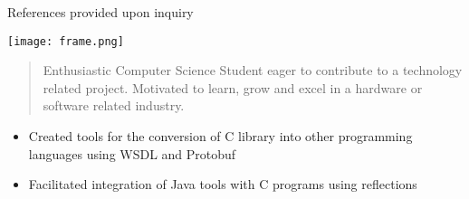 \documentclass[10pt,a4paper,ragged2e,withhyper]{altacv}
\begin{document}
\begin{paracol}{2}
            References provided upon inquiry
        
        \parskip 12pt
        \texttt{[image: frame.png]}
        
        \parskip 0pt
        
        
        
        
        \newpage
        
        \switchcolumn
        
            \begin{quote}
                Enthusiastic Computer Science Student eager to contribute to a technology related project. Motivated to learn, grow and excel in a hardware or software related industry.
            \end{quote}
        
            \begin{itemize}
                \item Created tools for the conversion of C library into
                other programming languages using WSDL and Protobuf
                \item Facilitated integration of Java tools with C programs using reflections
            \end{itemize}
        

\end{paracol}
\end{document}
